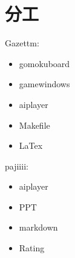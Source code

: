 \documentclass[UTF8]{ctexart}
\begin{document}
\section{分工}
Gazettm:
\begin{itemize}
	\item gomokuboard
    \item gamewindows
    \item aiplayer
    \item Makefile
    \item LaTex
\end{itemize}
\medskip
pajiiii:
\begin{itemize}
	\item aiplayer
	\item PPT
	\item markdown
	\item Rating
\end{itemize}
\end{document}
